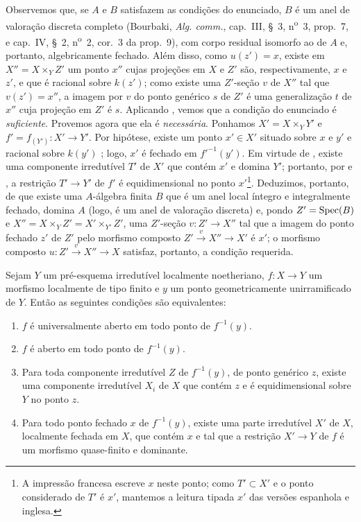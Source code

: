 Observemos que, se $A$ e $B$ satisfazem as condições do enunciado, $B$ é um anel de valoração discreta completo (Bourbaki, \emph{Alg. comm.}, cap.~III, \S~3, n\textsuperscript{o}~3, prop.~7, e cap.~IV, \S~2, n\textsuperscript{o}~2, cor.~3 da prop.~9), com corpo residual isomorfo ao de $A$ e, portanto, algebricamente fechado.
Além disso, como $u(z')=x$, existe em $X''=X\times_Y Z'$ um ponto $x''$ cujas projeções em $X$ e $Z'$ são, respectivamente, $x$ e $z'$, e que é racional sobre $k(z')$; como existe uma $Z'$-seção $v$ de $X''$ tal que $v(z')=x''$, a imagem por $v$ do ponto genérico $s$ de $Z'$ é uma generalização $t$ de $x''$ cuja projeção em $Z'$ é $s$.
Aplicando , vemos que a condição do enunciado é \emph{suficiente}.
Provemos agora que ela é \emph{necessária}.
Ponhamos $X'=X\times_Y Y'$ e $f'=f_{(Y')}:X'\to Y'$.
Por hipótese, existe um ponto $x'\in X'$ situado sobre $x$ e $y'$ e racional sobre $k(y')$ ; logo, $x'$ é fechado em $f'^{-1}(y')$.
Em virtude de , existe uma componente irredutível $T'$ de $X'$ que contém $x'$ e domina $Y'$; portanto, por  e , a restrição $T'\to Y'$ de $f'$ é equidimensional no ponto $x'$\footnote{A impressão francesa escreve $x$ neste ponto; como $T'\subset X'$ e o ponto considerado de $T'$ é $x'$, mantemos a leitura tipada $x'$ das versões espanhola e inglesa.}.
Deduzimos, portanto, de  que existe uma $A$-álgebra finita $B$ que é um anel local íntegro e integralmente fechado, domina $A$ (logo, é um anel de valoração discreta) e, pondo $Z'=\operatorname{Spec}(B)$ e $X''=X\times_Y Z'=X'\times_{Y'}Z'$, uma $Z'$-seção $v:Z'\to X''$ tal que a imagem do ponto fechado $z'$ de $Z'$ pelo morfismo composto $Z'\xrightarrow{v}X''\to X'$ é $x'$; o morfismo composto $u:Z'\xrightarrow{v}X''\to X$ satisfaz, portanto, a condição requerida.

\begin{proposition}[14.5.9]
\label{IV.14.5.9}
Sejam $Y$ um pré-esquema irredutível localmente noetheriano, $f:X\to Y$ um morfismo localmente de tipo finito e $y$ um ponto geometricamente unirramificado de $Y$.
Então as seguintes condições são equivalentes:
\begin{enumerate}[label=\emph{\alph*)}]
  \item $f$ é universalmente aberto em todo ponto de $f^{-1}(y)$.
  \item $f$ é aberto em todo ponto de $f^{-1}(y)$.
  \item Para toda componente irredutível $Z$ de $f^{-1}(y)$, de ponto genérico $z$, existe uma componente irredutível $X_i$ de $X$ que contém $z$ e é equidimensional sobre $Y$ no ponto $z$.
  \item Para todo ponto fechado $x$ de $f^{-1}(y)$, existe uma parte irredutível $X'$ de $X$, localmente fechada em $X$, que contém $x$ e tal que a restrição $X'\to Y$ de $f$ é um morfismo quase-finito e dominante.
\end{enumerate}
\end{proposition}


